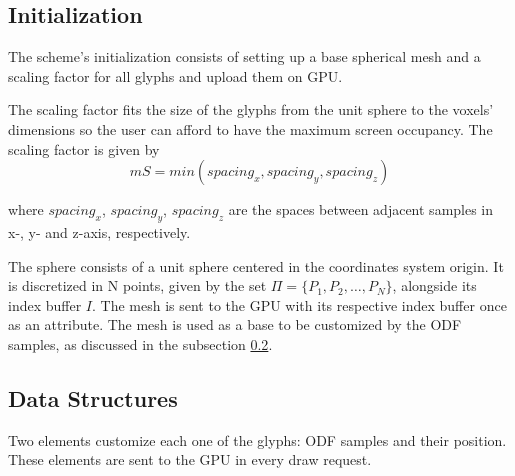 \documentclass[twoside,twocolumn,10pt]{article}
\begin{document}

\subsection{Initialization}
\label{ssec::precomputation}


The scheme's initialization consists of setting up a base spherical mesh and a scaling factor for all glyphs and upload them on GPU.

The scaling factor fits the size of the glyphs from the unit sphere to the voxels' dimensions so the user can afford to have the maximum screen occupancy. The scaling factor is given by 
\begin{equation}
mS = min(spacing_x, spacing_y, spacing_z)
\end{equation}

where $spacing_x$, $spacing_y$, $spacing_z$ are the spaces between adjacent samples in x-, y- and z-axis, respectively.

The sphere consists of a unit sphere centered in the coordinates system origin. It is discretized in N points, given by the set $\Pi = \{P_1, P_2, \dots, P_N\}$, alongside its index buffer $I$. The mesh is sent to the GPU with its respective index buffer once as an attribute. The mesh is used as a base to be customized by the ODF samples, as discussed in the subsection \ref{ssec::datastruct}.






\subsection{Data Structures}
\label{ssec::datastruct}

Two elements customize each one of the glyphs: ODF samples and their position. These elements are sent to the GPU in every draw request.
\end{document}
